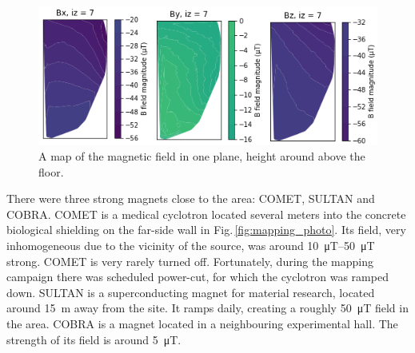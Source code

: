 
\begin{figure}
  \centering
  \includegraphics[width=\linewidth]{gfx/mapping/nSnCobCom.png}
  \caption{A map of the magnetic field in one plane, height around  above the floor. }\label{fig:mapping_p-i_map}
\end{figure}

There were three strong magnets close to the area: COMET, SULTAN and COBRA\@. COMET is a medical cyclotron located several meters into the concrete biological shielding on the far-side wall in Fig.\,\ref{fig:mapping_photo}. Its field, very inhomogeneous due to the vicinity of the source, was around \SIrange[range-phrase=--,range-units=single]{10}{50}{\micro\tesla} strong. COMET is very rarely turned off. Fortunately, during the mapping campaign there was scheduled power-cut, for which the cyclotron was ramped down. SULTAN is a superconducting magnet for material research, located around \SI{15}{\metre} away from the site. It ramps daily, creating a roughly \SI{50}{\micro\tesla} field in the area. COBRA is a magnet located in a neighbouring experimental hall. The strength of its field is around \SI{5}{\micro\tesla}.

